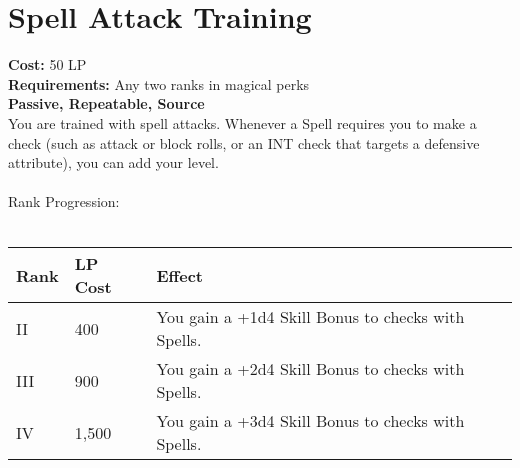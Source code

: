 \section{Spell Attack Training}\label{perk:spellAttackTraining}
\textbf{Cost:} 50 LP\\
\textbf{Requirements:} Any two ranks in magical perks\\
\textbf{Passive, Repeatable, Source}\\
You are trained with spell attacks.
Whenever a Spell requires you to make a check (such as attack or block rolls, or an INT check that targets a defensive attribute), you can add your level.\\
\\
Rank Progression:\\
\\
\begin{longtable}{l | l | p{9cm}}
	Rank & LP Cost & Effect\\
	\hline
	II & 400 & You gain a +1d4 Skill Bonus to checks with Spells.\\
	III & 900 & You gain a +2d4 Skill Bonus to checks with Spells.\\
	IV & 1,500 & You gain a +3d4 Skill Bonus to checks with Spells.\\
\end{longtable}
